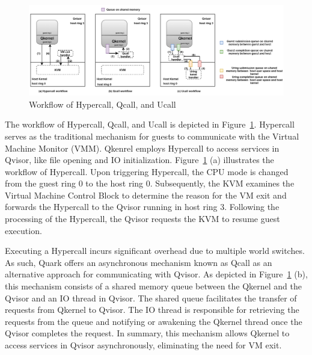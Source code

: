 \begin{figure}[htp]
  \centering
  \includegraphics[width=1\textwidth]{images/hypercall_qcall_ucall.png}
  \caption[Workflow of Hypercall, Qcall, and Ucall]{Workflow of Hypercall, Qcall, and Ucall}
  \label{fig:hypercall_qcall_ucall}
\end{figure}


The workflow of Hypercall, Qcall, and Ucall is depicted in Figure~\ref{fig:hypercall_qcall_ucall}. Hypercall serves as the traditional mechanism for guests to communicate with the Virtual Machine Monitor (VMM). Qkenrel employs Hypercall to access services in Qvisor, like file opening and IO 
initialization. Figure~\ref{fig:hypercall_qcall_ucall} (a) illustrates the workflow of Hypercall. Upon triggering Hypercall, the CPU mode is changed from the guest ring 0  to the host ring 0. Subsequently, the KVM examines the Virtual Machine Control Block to determine the reason for the VM exit and 
forwards the Hypercall to the Qvisor running in host ring 3. Following the processing of the Hypercall, the Qvisor requests the KVM to resume guest execution.

Executing a Hypercall incurs significant overhead due to multiple world switches. As such, Quark offers an asynchronous mechanism known as Qcall as an alternative approach for communicating with Qvisor. As depicted in Figure~\ref{fig:hypercall_qcall_ucall} (b), this mechanism consists of a 
shared memory queue between the Qkernel and the Qvisor and an IO thread in Qvisor. The shared queue facilitates the transfer of requests from Qkernel to Qvisor. The IO thread is responsible for retrieving the requests from the queue and notifying or awakening the Qkernel thread once the Qvisor 
completes the request. In summary, this mechanism allows Qkernel to access services in Qvisor asynchronously, eliminating the need for VM exit. 

